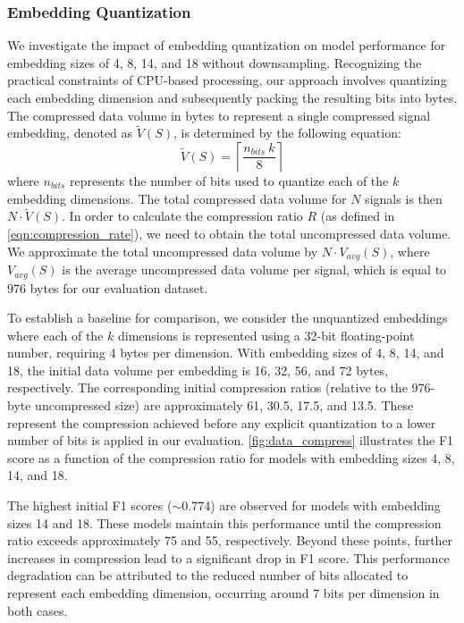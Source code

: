 \documentclass[sigconf, 10pt, nonacm, anonymous]{acmart}  %
\begin{document}
\subsubsection{Embedding Quantization}
We investigate the impact of embedding quantization on model performance for embedding sizes of 4, 8, 14, and 18 without downsampling. Recognizing the practical constraints of CPU-based processing, our approach involves quantizing each embedding dimension and subsequently packing the resulting bits into bytes. The compressed data volume in bytes to represent a single compressed signal embedding, denoted as $\tilde{V}(S)$, is determined by the following equation:
\begin{equation}
\tilde{V}(S) = \left\lceil\frac{n_{bits} \ k}{8}\right\rceil
\label{eqn:compressed_volum}
\end{equation}
where $n_{bits}$ represents the number of bits used to quantize each of the $k$ embedding dimensions. The total compressed data volume for $N$ signals is then $N \cdot \tilde{V}(S)$. In order to calculate the compression ratio $R$ (as defined in \autoref{eqn:compression_rate}), we need to obtain the total uncompressed data volume. We approximate the total uncompressed data volume by $N \cdot V_{avg}(S)$, where $V_{avg}(S)$ is the average uncompressed data volume per signal, which is equal to  976 bytes for our evaluation dataset.

To establish a baseline for comparison, we consider the unquantized embeddings where each of the $k$ dimensions is represented using a 32-bit floating-point number, requiring 4 bytes per dimension. With embedding sizes of 4, 8, 14, and 18, the initial data volume per embedding is 16, 32, 56, and 72 bytes, respectively. The corresponding initial compression ratios (relative to the  976-byte uncompressed size) are approximately 61, 30.5, 17.5, and 13.5. These represent the compression achieved before any explicit quantization to a lower number of bits is applied in our evaluation. \autoref{fig:data_compress} illustrates the F1 score as a function of the compression ratio for models with embedding sizes 4, 8, 14, and 18.

The highest initial F1 scores ($\sim$0.774) are observed for models with embedding sizes 14 and 18. These models maintain this performance until the compression ratio exceeds approximately 75 and 55, respectively. Beyond these points, further increases in compression lead to a significant drop in F1 score. This performance degradation can be attributed to the reduced number of bits allocated to represent each embedding dimension, occurring around 7 bits per dimension in both cases.
\end{document}

